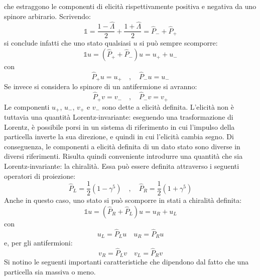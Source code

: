 \documentclass{subnucbo}
\begin{document}
che estraggono le componenti di elicità rispettivamente positiva e negativa da uno spinore arbirario. Scrivendo:
\begin{equation}
        \mathbb{1} = \frac { 1 - \hat{\Lambda } } { 2 } + \frac { 1 + \hat{\Lambda } } { 2 } = \hat{P}_{-} + \hat{P} _ { + }
\end{equation}
si conclude infatti che uno stato qualsiasi $u$ si può sempre scomporre:
\begin{equation}
        \mathbb { 1 } u = \left( \hat{P} _ { + } + \hat{P} _ { - } \right) u = u _ { + } + u _ { - }
\end{equation}
con
\begin{equation}
        \hat { P } _ { + } u = u_{+}\quad ,\quad \hat { P } _ { - } u = u_{-}
\end{equation}
Se invece si considera lo spinore di un antifermione si avranno:
\begin{equation}
        \hat { P } _ { + } v = v_{-} \quad ,\quad \hat { P } _ { - } v = v _ { + }
\end{equation}
Le componenti $u_{+}$, $u_{-}$, $v_{+}$ e $v_{-}$ sono dette a elicità definita.
L'elicità non è tuttavia una quantità Lorentz-invariante: eseguendo una trasformazione di Lorentz, è possibile porsi in un sistema di riferimento in cui l'impulso della particella inverte la sua direzione, e quindi in cui l'elicità cambia segno. Di conseguenza, le componenti a elicità definita di un dato stato sono diverse in diversi riferimenti.
Risulta quindi conveniente introdurre una quantità che sia Lorentz-invariante: la chiralità. Essa può essere definita attraverso i seguenti operatori di proiezione:
\begin{equation}
        \hat{P}_ { L } = \frac { 1 } { 2 } \left( 1 - \gamma ^ { 5 } \right) \quad , \quad \hat{P} _ { R } = \frac { 1 } { 2 } \left( 1 + \gamma ^ { 5 } \right)
        \label{eq:plpr}
\end{equation}
Anche in questo caso, uno stato si può scomporre in stati a chiralità definita:
\begin{equation}
        \mathbb { 1 } u = \left( \hat{P} _ { R } + \hat{P} _ { L } \right) u = u _ { R } + u _ { L }
\end{equation}
con
\begin{equation}
        u _ { L } = \hat{P} _ { L } u \quad u _ { R } = \hat{P} _ { R } u
\end{equation}
e, per gli antifermioni:
\begin{equation}
        v _ { R } = \hat{P} _ { L } v \quad v _ { L } = \hat{P} _ { R } v
\end{equation}
Si notino le seguenti importanti caratteristiche che dipendono dal fatto che una particella sia massiva o meno.
\end{document}
